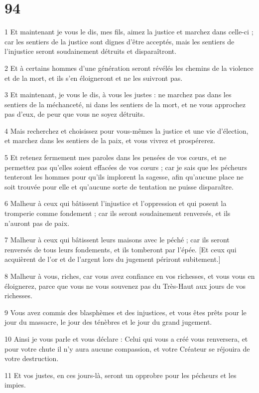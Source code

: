 \chapter{94}

\par 1 Et maintenant je vous le dis, mes fils, aimez la justice et marchez dans celle-ci ; car les sentiers de la justice sont dignes d'être acceptés, mais les sentiers de l'injustice seront soudainement détruits et disparaîtront.
\par 2 Et à certains hommes d'une génération seront révélés les chemins de la violence et de la mort, et ils s'en éloigneront et ne les suivront pas.
\par 3 Et maintenant, je vous le dis, à vous les justes : ne marchez pas dans les sentiers de la méchanceté, ni dans les sentiers de la mort, et ne vous approchez pas d'eux, de peur que vous ne soyez détruits.
\par 4 Mais recherchez et choisissez pour vous-mêmes la justice et une vie d'élection, et marchez dans les sentiers de la paix, et vous vivrez et prospérerez.
\par 5 Et retenez fermement mes paroles dans les pensées de vos cœurs, et ne permettez pas qu'elles soient effacées de vos cœurs ; car je sais que les pécheurs tenteront les hommes pour qu'ils implorent la sagesse, afin qu'aucune place ne soit trouvée pour elle et qu'aucune sorte de tentation ne puisse disparaître.
\par 6 Malheur à ceux qui bâtissent l'injustice et l'oppression et qui posent la tromperie comme fondement ; car ils seront soudainement renversés, et ils n'auront pas de paix.
\par 7 Malheur à ceux qui bâtissent leurs maisons avec le péché ; car ils seront renversés de tous leurs fondements, et ils tomberont par l'épée. [Et ceux qui acquièrent de l’or et de l’argent lors du jugement périront subitement.]
\par 8 Malheur à vous, riches, car vous avez confiance en vos richesses, et vous vous en éloignerez, parce que vous ne vous souvenez pas du Très-Haut aux jours de vos richesses.
\par 9 Vous avez commis des blasphèmes et des injustices, et vous êtes prêts pour le jour du massacre, le jour des ténèbres et le jour du grand jugement.
\par 10 Ainsi je vous parle et vous déclare : Celui qui vous a créé vous renversera, et pour votre chute il n'y aura aucune compassion, et votre Créateur se réjouira de votre destruction.
\par 11 Et vos justes, en ces jours-là, seront un opprobre pour les pécheurs et les impies.

